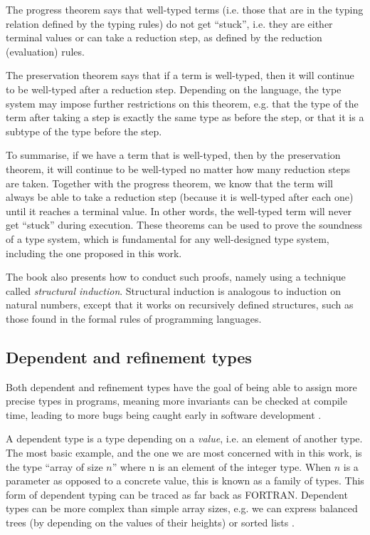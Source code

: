 The progress theorem says that well-typed terms (i.e. those that are in the
typing relation defined by the typing rules) do not get ``stuck'', i.e. they are
either terminal values or can take a reduction step, as defined by the reduction
(evaluation) rules.

The preservation theorem says that if a term is well-typed, then it will
continue to be well-typed after a reduction step. Depending on the language,
the type system may impose further restrictions on this theorem, e.g. that
the type of the term after taking a step is exactly the same type as before
the step, or that it is a subtype of the type before the step.

To summarise, if we have a term that is well-typed, then by the preservation
theorem, it will continue to be well-typed no matter how many reduction steps
are taken. Together with the progress theorem, we know that the term will always
be able to take a reduction step (because it is well-typed after each one) until
it reaches a terminal value. In other words, the well-typed term will never get
``stuck'' during execution. These theorems can be used to prove the soundness of
a type system, which is fundamental for any well-designed type system, including
the one proposed in this work.

The book also presents how to conduct such proofs, namely using a technique
called \emph{structural induction}. Structural induction is analogous to
induction on natural numbers, except that it works on recursively defined
structures, such as those found in the formal rules of programming languages.

\subsection{Dependent and refinement types}

Both dependent and refinement types have the goal of being able to assign more
precise types in programs, meaning more invariants can be checked at compile
time, leading to more bugs being caught early in software development
\autocites{dependentPractical}{refinement}.

A dependent type is a type depending on a \emph{value}, i.e. an element of
another type. The most basic example, and the one we are most concerned with in
this work, is the type ``array of size $n$'' where n is an element of the
integer type. When $n$ is a parameter as opposed to a concrete value, this is
known as a family of types. This form of dependent typing can be traced as far
back as FORTRAN. Dependent types can be more complex than simple array sizes,
e.g. we can express balanced trees (by depending on the values of their heights)
or sorted lists \autocite{dependentAtWork}.

